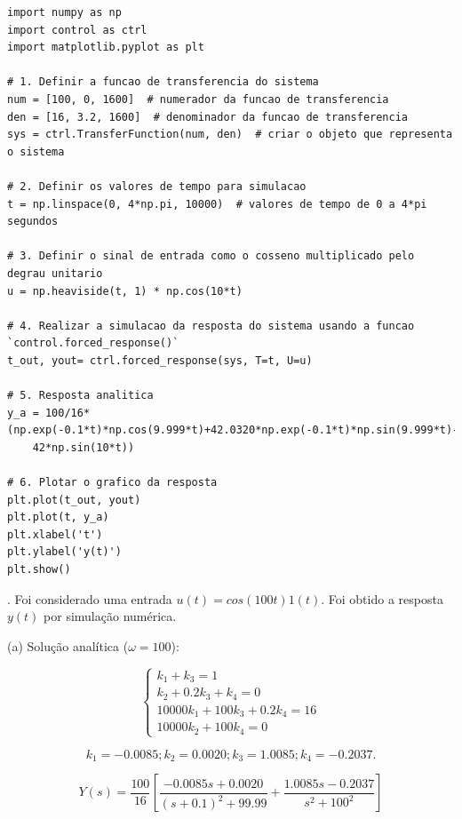 \documentclass[10pt]{article}
\begin{document}
\begin{lstlisting}
import numpy as np
import control as ctrl
import matplotlib.pyplot as plt

# 1. Definir a funcao de transferencia do sistema
num = [100, 0, 1600]  # numerador da funcao de transferencia
den = [16, 3.2, 1600]  # denominador da funcao de transferencia
sys = ctrl.TransferFunction(num, den)  # criar o objeto que representa o sistema

# 2. Definir os valores de tempo para simulacao
t = np.linspace(0, 4*np.pi, 10000)  # valores de tempo de 0 a 4*pi segundos

# 3. Definir o sinal de entrada como o cosseno multiplicado pelo degrau unitario
u = np.heaviside(t, 1) * np.cos(10*t)

# 4. Realizar a simulacao da resposta do sistema usando a funcao `control.forced_response()`
t_out, yout= ctrl.forced_response(sys, T=t, U=u)

# 5. Resposta analitica
y_a = 100/16*(np.exp(-0.1*t)*np.cos(9.999*t)+42.0320*np.exp(-0.1*t)*np.sin(9.999*t)-
    42*np.sin(10*t))

# 6. Plotar o grafico da resposta
plt.plot(t_out, yout)
plt.plot(t, y_a)
plt.xlabel('t')
plt.ylabel('y(t)')
plt.show()
\end{lstlisting}

\newpage

. Foi considerado uma entrada $u(t) = cos(100 t) 1(t)$. Foi obtido a resposta $y(t)$ por simulação numérica.

\quad (a) Solução analítica ($\omega = 100$):

\begin{equation}
    \left\{
    \begin{array}{l}
        k_1 + k_3 = 1 \\
        k_2 + 0.2k_3 +k_4 = 0 \\
        10000k_1 + 100k_3 + 0.2k_4 = 16 \\
        10000k_2 + 100k_4 = 0
    \end{array}
    \right. 
\end{equation}

\begin{equation}
    k_1 = -0.0085; k_2 = 0.0020; k_3 = 1.0085; k_4 = -0.2037.
\end{equation}

\begin{equation}
    Y(s) = \frac{100}{16} \left[ \frac{-0.0085s+0.0020}{(s + 0.1)^2 + 99.99} + \frac{1.0085s -0.2037}{s^2 + 100^2} \right]
\end{equation}
\end{document}
